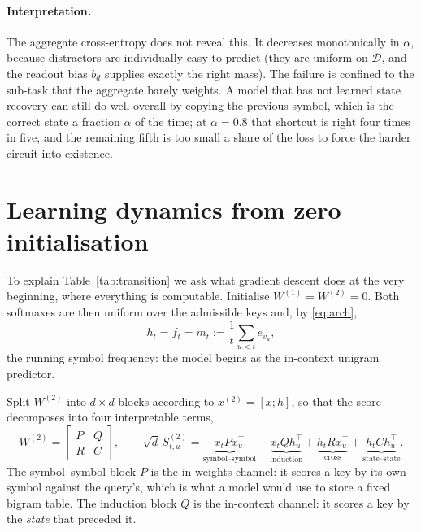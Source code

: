 \paragraph{Interpretation.}
The aggregate cross-entropy does not reveal this. It decreases monotonically in $\alpha$, because
distractors are individually easy to predict (they are uniform on $\mathcal{D}$, and the readout
bias $b_d$ supplies exactly the right mass). The failure is confined to the sub-task that the
aggregate barely weights. A model that has not learned state recovery can still do well overall by
copying the previous symbol, which is the correct state a fraction $\alpha$ of the time; at
$\alpha=0.8$ that shortcut is right four times in five, and the remaining fifth is too small a
share of the loss to force the harder circuit into existence.


\section{Learning dynamics from zero initialisation}
\label{sec:dynamics}

To explain Table~\ref{tab:transition} we ask what gradient descent does at the very beginning,
where everything is computable. Initialise $W^{(1)}=W^{(2)}=0$. Both softmaxes are then uniform
over the admissible keys and, by \eqref{eq:arch},
\begin{equation}
h_t=f_t=m_t:=\frac1t\sum_{u<t}e_{v_u},
\end{equation}
the running symbol frequency: the model begins as the in-context unigram predictor.

Split $W^{(2)}$ into $d\times d$ blocks according to $x^{(2)}=[x;h]$, so that the score
decomposes into four interpretable terms,
\begin{equation}
W^{(2)}=\begin{bmatrix}P & Q\\ R & C\end{bmatrix},\qquad
\sqrt d\,S^{(2)}_{t,u}=\underbrace{x_tPx_u^\top}_{\text{symbol--symbol}}
+\underbrace{x_tQh_u^\top}_{\text{induction}}
+\underbrace{h_tRx_u^\top}_{\text{cross}}
+\underbrace{h_tCh_u^\top}_{\text{state--state}}.
\label{eq:blocks}
\end{equation}
The symbol--symbol block $P$ is the in-weights channel: it scores a key by its own symbol against
the query's, which is what a model would use to store a fixed bigram table. The induction block
$Q$ is the in-context channel: it scores a key by the \emph{state} that preceded it.

